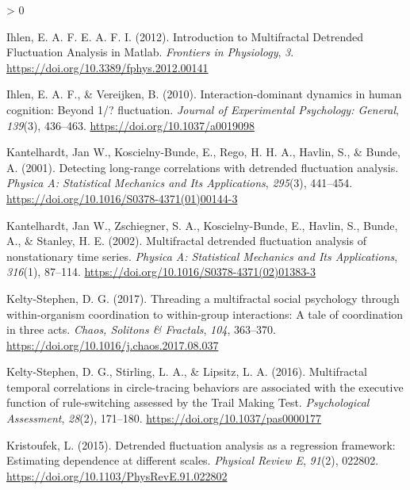 \documentclass[
  english,
  man]{apa6}
\newlength{\cslhangindent}
\newenvironment{CSLReferences}[2] %
 {%
  \setlength{\parindent}{0pt}
  \ifodd #1 \everypar{\setlength{\hangindent}{\cslhangindent}}\ignorespaces\fi
  \ifnum #2 > 0
  \setlength{\parskip}{#2\baselineskip}
  \fi
 }%
 {}
\begin{document}
\begin{CSLReferences}{1}{0}
\leavevmode\hypertarget{ref-ihlenIntroductionMultifractalDetrended2012}{}%
Ihlen, E. A. F. E. A. F. I. (2012). Introduction to {Multifractal} {Detrended} {Fluctuation} {Analysis} in {Matlab}. \emph{Frontiers in Physiology}, \emph{3}. \url{https://doi.org/10.3389/fphys.2012.00141}

\leavevmode\hypertarget{ref-ihlen2010}{}%
Ihlen, E. A. F., \& Vereijken, B. (2010). Interaction-dominant dynamics in human cognition: Beyond 1/{{}}? fluctuation. \emph{Journal of Experimental Psychology: General}, \emph{139}(3), 436--463. \url{https://doi.org/10.1037/a0019098}

\leavevmode\hypertarget{ref-kantelhardtDetectingLongrangeCorrelations2001}{}%
Kantelhardt, Jan W., Koscielny-Bunde, E., Rego, H. H. A., Havlin, S., \& Bunde, A. (2001). Detecting long-range correlations with detrended fluctuation analysis. \emph{Physica A: Statistical Mechanics and Its Applications}, \emph{295}(3), 441--454. \url{https://doi.org/10.1016/S0378-4371(01)00144-3}

\leavevmode\hypertarget{ref-kantelhardtMultifractalDetrendedFluctuation2002}{}%
Kantelhardt, Jan W., Zschiegner, S. A., Koscielny-Bunde, E., Havlin, S., Bunde, A., \& Stanley, H. E. (2002). Multifractal detrended fluctuation analysis of nonstationary time series. \emph{Physica A: Statistical Mechanics and Its Applications}, \emph{316}(1), 87--114. \url{https://doi.org/10.1016/S0378-4371(02)01383-3}

\leavevmode\hypertarget{ref-kelty-stephenThreadingMultifractalSocial2017}{}%
Kelty-Stephen, D. G. (2017). Threading a multifractal social psychology through within-organism coordination to within-group interactions: {A} tale of coordination in three acts. \emph{Chaos, Solitons \& Fractals}, \emph{104}, 363--370. \url{https://doi.org/10.1016/j.chaos.2017.08.037}

\leavevmode\hypertarget{ref-kelty-stephenMultifractalTemporalCorrelations2016}{}%
Kelty-Stephen, D. G., Stirling, L. A., \& Lipsitz, L. A. (2016). Multifractal temporal correlations in circle-tracing behaviors are associated with the executive function of rule-switching assessed by the {Trail} {Making} {Test}. \emph{Psychological Assessment}, \emph{28}(2), 171--180. \url{https://doi.org/10.1037/pas0000177}

\leavevmode\hypertarget{ref-kristoufekDetrendedFluctuationAnalysis2015}{}%
Kristoufek, L. (2015). Detrended fluctuation analysis as a regression framework: {Estimating} dependence at different scales. \emph{Physical Review E}, \emph{91}(2), 022802. \url{https://doi.org/10.1103/PhysRevE.91.022802}


\end{CSLReferences}
\end{document}
